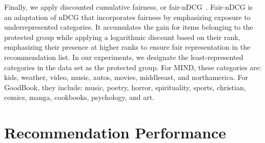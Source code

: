\documentclass[runningheads]{llncs}
\begin{document}
Finally, we apply discounted cumulative fairness, or fair-nDCG~\cite{Pitoura2021Fairness}. 
Fair-nDCG is an adaptation of nDCG that incorporates fairness by emphasizing exposure to underrepresented categories. 
It accumulates the gain for items belonging to the protected group while applying a logarithmic discount based on their rank, emphasizing their presence at higher ranks to ensure fair representation in the recommendation list. 
In our experiments, we designate the least-represented categories in the data set as the protected group. 
For MIND, these categories are: kids, weather, video, music, autos, movies, middleeast, and northamerica. For GoodBook, they include: music, poetry, horror, spirituality, sports, christian, comics, manga, cookbooks, psychology, and art.



\section{Recommendation Performance}
\end{document}
